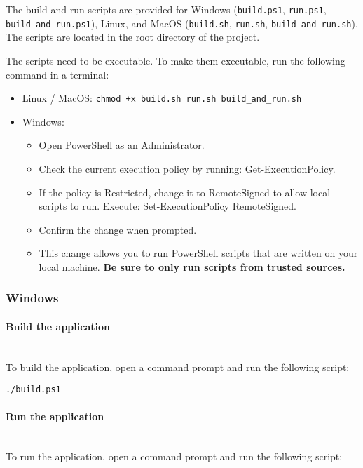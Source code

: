 The build and run scripts are provided for Windows (\texttt{build.ps1}, \texttt{run.ps1}, \texttt{build\_and\_run.ps1}), Linux, and
MacOS (\texttt{build.sh}, \texttt{run.sh}, \texttt{build\_and\_run.sh}). The scripts are located in the root directory of the project.

\begin{bfhWarnBox}
	The scripts need to be executable. To make them executable, run the following command in a terminal:
	\begin{itemize}
		\item Linux / MacOS: \texttt{chmod +x build.sh run.sh build\_and\_run.sh}
		\item Windows: 
		\begin{itemize}
			\item Open PowerShell as an Administrator. 
			\item Check the current execution policy by running: Get-ExecutionPolicy. 
			\item If the policy is Restricted, change it to RemoteSigned to allow local scripts to run. Execute: Set-ExecutionPolicy RemoteSigned. 
			\item Confirm the change when prompted.
			\item This change allows you to run PowerShell scripts that are written on your local machine. \textbf{Be sure to only run scripts from trusted sources.}
		\end{itemize}
	\end{itemize}
\end{bfhWarnBox}

\subsubsection{Windows}

\paragraph{Build the application}
\mbox{}\\
To build the application, open a command prompt and run the following script:

\begin{lstlisting}[numbers=none]
./build.ps1
\end{lstlisting}

\paragraph{Run the application}
\mbox{}\\
To run the application, open a command prompt and run the following script:

